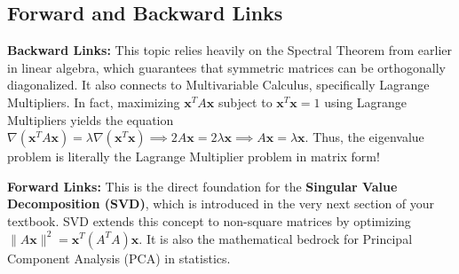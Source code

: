 \documentclass[11pt, letterpaper]{article}
\theoremstyle{definition}
\theoremstyle{remark}
\begin{document}
\begin{center}
\end{center}

\subsection{Forward and Backward Links}
\textbf{Backward Links:} This topic relies heavily on the Spectral Theorem from earlier in linear algebra, which guarantees that symmetric matrices can be orthogonally diagonalized. It also connects to Multivariable Calculus, specifically Lagrange Multipliers. In fact, maximizing $\mathbf{x}^T A \mathbf{x}$ subject to $\mathbf{x}^T\mathbf{x} = 1$ using Lagrange Multipliers yields the equation $\nabla(\mathbf{x}^T A \mathbf{x}) = \lambda \nabla(\mathbf{x}^T\mathbf{x}) \implies 2A\mathbf{x} = 2\lambda\mathbf{x} \implies A\mathbf{x} = \lambda\mathbf{x}$. Thus, the eigenvalue problem is literally the Lagrange Multiplier problem in matrix form!

\textbf{Forward Links:} This is the direct foundation for the \textbf{Singular Value Decomposition (SVD)}, which is introduced in the very next section of your textbook. SVD extends this concept to non-square matrices by optimizing $\|A\mathbf{x}\|^2 = \mathbf{x}^T (A^T A) \mathbf{x}$. It is also the mathematical bedrock for Principal Component Analysis (PCA) in statistics.
\end{document}
